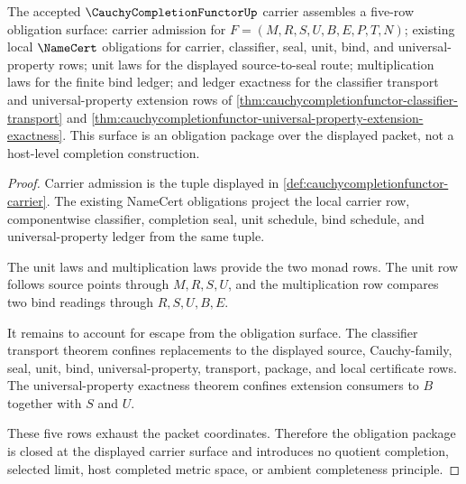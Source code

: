 \begin{theorem}
\label{thm:cauchycompletionfunctor-obligation-closure-package}
The accepted $\CauchyCompletionFunctorUp$ carrier assembles a five-row obligation surface: carrier admission for $F=(M,R,S,U,B,E,P,T,N)$; existing local $\NameCert$ obligations for carrier, classifier, seal, unit, bind, and universal-property rows; unit laws for the displayed source-to-seal route; multiplication laws for the finite bind ledger; and ledger exactness for the classifier transport and universal-property extension rows of \autoref{thm:cauchycompletionfunctor-classifier-transport} and \autoref{thm:cauchycompletionfunctor-universal-property-extension-exactness}. This surface is an obligation package over the displayed packet, not a host-level completion construction.
\end{theorem}
\begin{proof}
Carrier admission is the tuple displayed in \autoref{def:cauchycompletionfunctor-carrier}. The existing NameCert obligations project the local carrier row, componentwise classifier, completion seal, unit schedule, bind schedule, and universal-property ledger from the same tuple.

The unit laws and multiplication laws provide the two monad rows. The unit row follows source points through $M,R,S,U$, and the multiplication row compares two bind readings through $R,S,U,B,E$.

It remains to account for escape from the obligation surface. The classifier transport theorem confines replacements to the displayed source, Cauchy-family, seal, unit, bind, universal-property, transport, package, and local certificate rows. The universal-property exactness theorem confines extension consumers to $B$ together with $S$ and $U$.

These five rows exhaust the packet coordinates. Therefore the obligation package is closed at the displayed carrier surface and introduces no quotient completion, selected limit, host completed metric space, or ambient completeness principle.
\end{proof}

